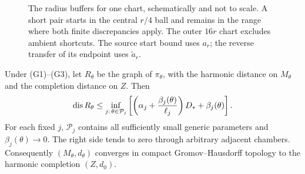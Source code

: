 \begin{figure}[tb]
 \centering
 \resizebox{\linewidth}{!}{}
 \caption{The radius buffers for one chart, schematically and
 not to scale. A short pair starts in the central \(r/4\)
 ball and remains in the range where both finite discrepancies
 apply. The outer \(16r\) chart excludes ambient shortcuts.
 The source start bound uses \(a_r\); the reverse transfer
 of its endpoint uses \(\widetilde a_r\).}
 \label{fig:buffers}
\end{figure}

\begin{theorem}\label{thm:quantitative}
Under \textup{(G1)--(G3)}, let \(R_\theta\) be the graph of
\(\pi_\theta\), with the harmonic distance on \(M_\theta\) and
the completion distance on \(Z\). Then
\begin{equation}\label{eq:global-distortion}
 \operatorname{dis} R_\theta\le
 \inf_{j:\,\theta\in\mathcal P_j}
 \left[\left(\alpha_j+\frac{\beta_j(\theta)}{\ell_j}\right)D_*
              +\beta_j(\theta)\right].
\end{equation}
For each fixed \(j\), \(\mathcal P_j\) contains all sufficiently
small generic parameters and \(\beta_j(\theta)\to0\).
The right side tends to zero through arbitrary adjacent chambers.
Consequently \((M_\theta,d_\theta)\) converges in compact
Gromov--Hausdorff topology to the harmonic completion \((Z,d_0)\).
\end{theorem}

